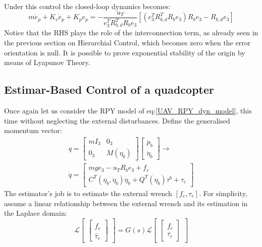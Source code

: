 Under this control the closed-loop dynamics becomes:
\begin{equation*}
    m\ddot{e}_p+K_v\dot{e}_p+K_pe_p=-\frac{u_T}{e_3^TR_{b,d}^TR_be_3}\left[\left(e_3^TR_{b,d}^TR_be_3\right)R_be_3-R_{b,d}e_3\right]
\end{equation*}
Notice that the RHS plays the role of the interconnection term,  as already seen in the previous section on Hierarchial Control, which becomes zero when the error orientation is null. It is possible to prove exponential stability of the origin by means of Lyapunov Theory.
\subsection{Estimar-Based Control of a quadcopter}
Once again let us consider the RPY model of eq:\ref{UAV_RPY_dyn_model}, this time without neglecting the external disturbances. Define the generalised momentum vector:
\begin{gather}\label{UAV_estimator_based_control_gen_momentum}
    q=
    \begin{bmatrix}
        mI_3 & 0_3\\ 0_3 & M(\eta_b)
    \end{bmatrix}
    \begin{bmatrix}
        \dot{p}_b\\ \dot{\eta}_b
    \end{bmatrix}\rightarrow\\
    \dot{q}=
    \begin{bmatrix}
        mge_3-u_{T}R_be_3+f_e\\
        C^{T}(\eta_b,\dot{\eta}_b)\dot{\eta}_b+Q^{T}(\eta_b)\tau^{b}+\tau_e
    \end{bmatrix}
\end{gather}
The estimator's job is to estimate the external wrench $[f_e,\tau_e]$. For simplicity, assume a linear relationship between the external wrench and its estimation in the Laplace domain:
\begin{equation*}
    \mathcal{L}
    \begin{bmatrix}
        \begin{bmatrix}
            \hat{f}_e \\ \hat{\tau}_e
        \end{bmatrix}    
    \end{bmatrix}=
    G(s)\mathcal{L}
    \begin{bmatrix}
        \begin{bmatrix}
            f_e \\ \tau_e
        \end{bmatrix}    
    \end{bmatrix}
\end{equation*}
